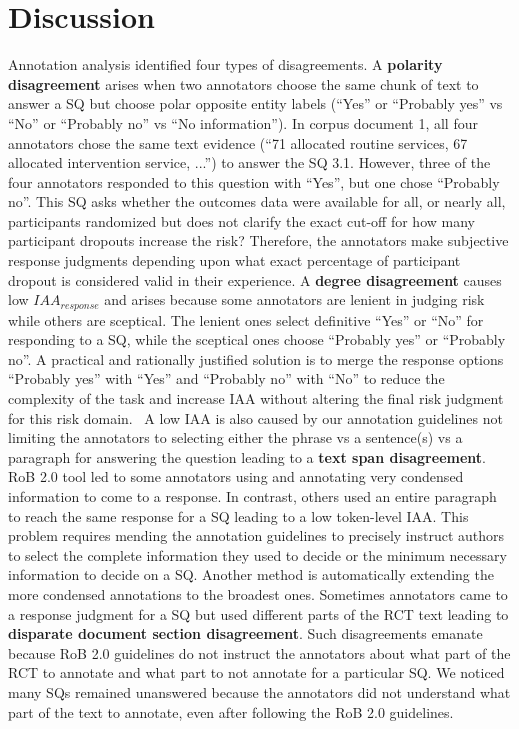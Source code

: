 \documentclass{IOS-Book-Article}
\begin{document}
\section{Discussion}
\label{sec:disc}
%
Annotation analysis identified four types of disagreements. 
A \textbf{polarity disagreement} arises when two annotators choose the same chunk of text to answer a SQ but choose polar opposite entity labels (``Yes'' or ``Probably yes'' vs ``No'' or ``Probably no'' vs ``No information'').
In corpus document 1, all four annotators chose the same text evidence (``71 allocated routine services, 67 allocated intervention service, ...'') to answer the SQ 3.1.
However, three of the four annotators responded to this question with ``Yes'', but one chose ``Probably no''.
This SQ asks whether the outcomes data were available for all, or nearly all, participants randomized but does not clarify the exact cut-off for how many participant dropouts increase the risk?
Therefore, the annotators make subjective response judgments depending upon what exact percentage of participant dropout is considered valid in their experience.
A \textbf{degree disagreement} causes low $IAA_{response}$ and arises because some annotators are lenient in judging risk while others are sceptical.
The lenient ones select definitive ``Yes'' or ``No'' for responding to a SQ, while the sceptical ones choose ``Probably yes'' or ``Probably no''.
A practical and rationally justified solution is to merge the response options ``Probably yes'' with ``Yes'' and ``Probably no'' with ``No'' to reduce the complexity of the task and increase IAA without altering the final risk judgment for this risk domain.~\cite{sterne2019rob}
A low IAA is also caused by our annotation guidelines not limiting the annotators to selecting either the phrase vs a sentence(s) vs a paragraph for answering the question leading to a \textbf{text span disagreement}.
RoB 2.0 tool led to some annotators using and annotating very condensed information to come to a response.
In contrast, others used an entire paragraph to reach the same response for a SQ leading to a low token-level IAA.
This problem requires mending the annotation guidelines to precisely instruct authors to select the complete information they used to decide or the minimum necessary information to decide on a SQ.
Another method is automatically extending the more condensed annotations to the broadest ones.
Sometimes annotators came to a response judgment for a SQ but used different parts of the RCT text leading to \textbf{disparate document section disagreement}.
Such disagreements emanate because RoB 2.0 guidelines do not instruct the annotators about what part of the RCT to annotate and what part to not annotate for a particular SQ.
We noticed many SQs remained unanswered because the annotators did not understand what part of the text to annotate, even after following the RoB 2.0 guidelines.
%
%
%
\end{document}
